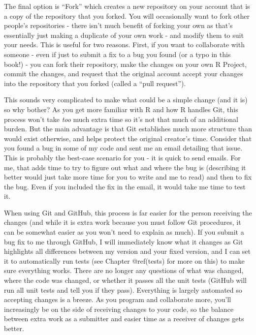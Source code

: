 \documentclass[
  a4paper,
]{krantz}
\begin{document}
The final option is ``Fork'' which creates a new repository
on your account that is a copy of the repository that you
forked. You will occasionally want to fork other people's
repositories - there isn't much benefit of forking your own
as that's essentially just making a duplicate of your own
work - and modify them to suit your needs. This is useful
for two reasons. First, if you want to collaborate with
someone - even if just to submit a fix to a bug you found
(or a typo in this book!) - you can fork their repository,
make the changes on your own R Project, commit the changes,
and request that the original account accept your changes
into the repository that you forked (called a ``pull
request'').

This sounds very complicated to make what could be a simple
change (and it is) so why bother? As you get more familiar
with R and how R handles Git, this process won't take
\emph{too} much extra time so it's not that much of an
additional burden. But the main advantage is that Git
establishes much more structure than would exist otherwise,
and helps protect the original creator's time. Consider that
you found a bug in some of my code and sent me an email
detailing that issue. This is probably the best-case
scenario for you - it is quick to send emails. For me, that
adds time to try to figure out what and where the bug is
(describing it better would just take more time for you to
write and me to read) and then to fix the bug. Even if you
included the fix in the email, it would take me time to test
it.

When using Git and GitHub, this process is far easier for
the person receiving the changes (and while it is extra work
because you must follow Git procedures, it can be somewhat
easier as you won't need to explain as much). If you submit
a bug fix to me through GitHub, I will immediately know what
it changes as Git highlights all differences between my
version and your fixed version, and I can set it to
automatically run tests (see Chapter @ref(tests) for more on
this) to make sure everything works. There are no longer any
questions of what was changed, where the code was changed,
or whether it passes all the unit tests (GitHub will run all
unit tests and tell you if they pass). Everything is largely
automated so accepting changes is a breeze. As you program
and collaborate more, you'll increasingly be on the side of
receiving changes to your code, so the balance between extra
work as a submitter and easier time as a receiver of changes
gets better.
\end{document}
